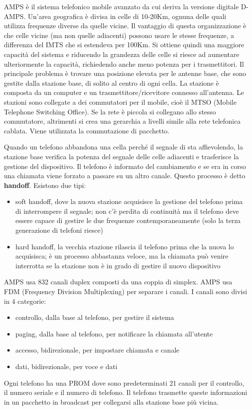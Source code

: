 AMPS è il sistema telefonico mobile avanzato da cui deriva la versione digitale D-AMPS.
Un'area geografica è divisa in celle di 10-20Km, ognuna delle quali utilizza frequenze diverse da quelle vicine.
Il vantaggio di questa organizzazione è che celle vicine (ma non quelle adiacenti) possono usare le stesse frequenze, a differenza del IMTS che si estendeva per 100Km.
Si ottiene quindi una maggiore capacità del sistema e riducendo la grandezza delle celle si riesce ad aumentare ulteriormente la capacità, richiedendo anche meno potenza per i trasmettitori.
Il principale problema è trovare una posizione elevata per le antenne base, che sono gestite dalla stazione base, di solito al centro di ogni cella.
La stazione è composta da un computer e un trasmettitore/ricevitore connesso all'antenna.
Le stazioni sono collegate a dei commutatori per il mobile, cioè il MTSO (Mobile Telephone Switching Office).
Se la rete è piccola si collegano allo stesso commutatore, altrimenti si crea una gerarchia a livelli simile alla rete telefonica cablata.
Viene utilizzata la commutazione di pacchetto.

Quando un telefono abbandona una cella perché il segnale di sta affievolendo, la stazione base verifica la potenza del segnale delle celle adiacenti e trasferisce la gestione del dispositivo.
Il telefono è informato del cambiamento e se era in corso una chiamata viene forzato a passare su un altro canale. 
Questo processo è detto \textbf{handoff}. Esistono due tipi:
\begin{itemize}
    \item soft handoff, dove la nuova stazione acquisisce la gestione del telefono prima di interrompere il segnale;
    non c'è perdita di continuità ma il telefono deve essere capace di gestire le due frequenze contemporaneamente (solo la terza generazione di telefoni riesce)
    \item hard handoff, la vecchia stazione rilascia il telefono prima che la nuova lo acquisisca;
    è un processo abbastanza veloce, ma la chiamata può venire interrotta se la stazione non è in grado di gestire il nuovo dispositivo
\end{itemize}
AMPS usa 832 canali duplex composti da una coppia di simplex. 
AMPS usa FDM (Frequency Division Multiplexing) per separare i canali.
I canali sono divisi in 4 categorie:
\begin{itemize}
    \item controllo, dalla base al telefono, per gestire il sistema
    \item paging, dalla base al telefono, per notificare la chiamata all'utente
    \item accesso, bidirezionale, per impostare chiamata e canale
    \item dati, bidirezionale, per voce e dati
\end{itemize}
Ogni telefono ha una PROM dove sono predeterminati 21 canali per il controllo, il numero seriale e il numero di telefono. 
Il telefono trasmette queste informazioni in un pacchetto in broadcast per collegarsi alla stazione base più vicina.

